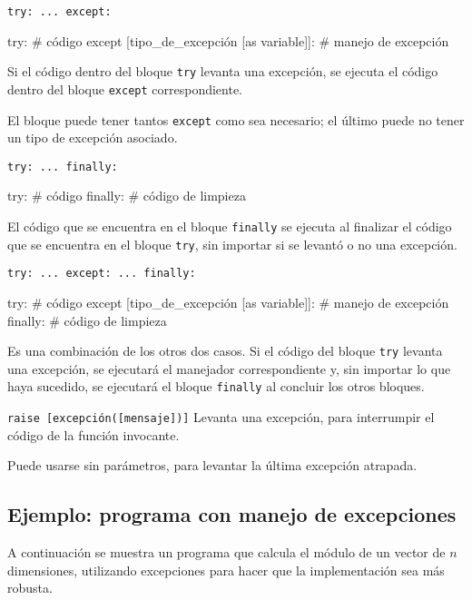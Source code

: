 \begin{referencia_python}

\begin{sintaxis}{\lstinline{try: ... except:}}
\begin{codigo-python-sn}
try:
    # código
except [tipo_de_excepción [as variable]]:
    # manejo de excepción
\end{codigo-python-sn}

Si el código dentro del bloque \lstinline!try! levanta una excepción, se
ejecuta el código dentro del bloque \lstinline!except! correspondiente.

El bloque puede tener tantos \lstinline!except! como sea necesario; el último
puede no tener un tipo de excepción asociado.
\end{sintaxis}

\begin{sintaxis}{\lstinline{try: ... finally:}}
\begin{codigo-python-sn}
try:
    # código
finally:
    # código de limpieza
\end{codigo-python-sn}

El código que se encuentra en el bloque \lstinline!finally! se ejecuta al
finalizar el código que se encuentra en el bloque \lstinline!try!, sin
importar si se levantó o no una excepción.
\end{sintaxis}

\begin{sintaxis}{\lstinline{try: ... except: ... finally:}}
\begin{codigo-python-sn}
try:
    # código
except [tipo_de_excepción [as variable]]:
    # manejo de excepción
finally:
    # código de limpieza
\end{codigo-python-sn}

Es una combinación de los otros dos casos.  Si el código del bloque
\lstinline!try! levanta una excepción, se ejecutará el manejador
correspondiente y, sin importar lo que haya sucedido, se ejecutará el
bloque \lstinline!finally! al concluir los otros bloques.
\end{sintaxis}

\begin{sintaxis}{\lstinline{raise [excepción([mensaje])]}}
Levanta una excepción, para interrumpir el código de la función invocante.

Puede usarse sin parámetros, para levantar la última excepción atrapada.
\end{sintaxis}

\end{referencia_python}

\newpage
\begin{subappendices}
\section{Ejemplo: programa con manejo de excepciones}

A continuación se muestra un programa que calcula el módulo de un vector de $n$
dimensiones, utilizando excepciones para hacer que la implementación sea más
robusta.


\end{subappendices}
